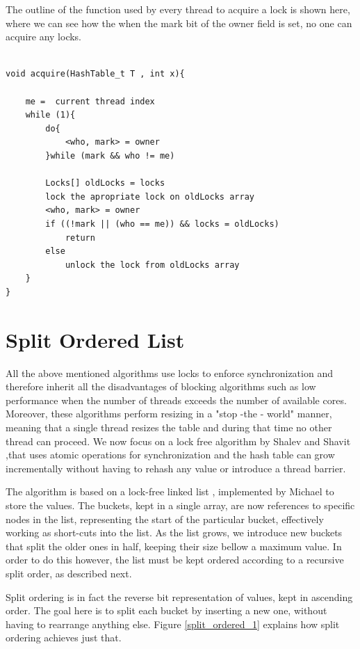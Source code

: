 The outline of the function used by every thread to acquire a lock is shown here, where we can see how the when the mark bit of the owner field is set, no one can acquire any locks.

\begin{lstlisting}

void acquire(HashTable_t T , int x){
	
	me =  current thread index
	while (1){
		do{
			<who, mark> = owner
		}while (mark && who != me)
		
		Locks[] oldLocks = locks
		lock the apropriate lock on oldLocks array
		<who, mark> = owner
		if ((!mark || (who == me)) && locks = oldLocks)
			return
		else 
			unlock the lock from oldLocks array 
	}
}

\end{lstlisting}


\section { Split Ordered List}

All the above mentioned algorithms use locks to enforce synchronization and therefore inherit all the disadvantages of blocking algorithms such as low performance when the number of threads exceeds the number of available cores. Moreover, these algorithms perform resizing in a "stop -the - world" manner, meaning that a single thread resizes the table and during that time no other thread can proceed. We now focus on a lock free algorithm  by  Shalev and Shavit  \cite{split_ordered} ,that uses atomic operations for synchronization and the hash table can grow incrementally without having to rehash any value or introduce a thread barrier.

The algorithm is based on a lock-free linked list , implemented by Michael \cite{lock_free_list} to store the values. The buckets, kept in a single array, are now references to specific nodes in the list, representing the start of the particular bucket, effectively working as short-cuts into the list. As the list grows, we introduce new buckets that split the older ones in half, keeping their size bellow a maximum value. In order to do this however, the list must be kept ordered according to a recursive split order, as described next.

Split ordering is in fact the reverse bit representation of values, kept in ascending order. The goal here is to split each bucket by inserting a new one, without having to rearrange anything else. Figure \ref{split_ordered_1} explains how split ordering achieves just that.

